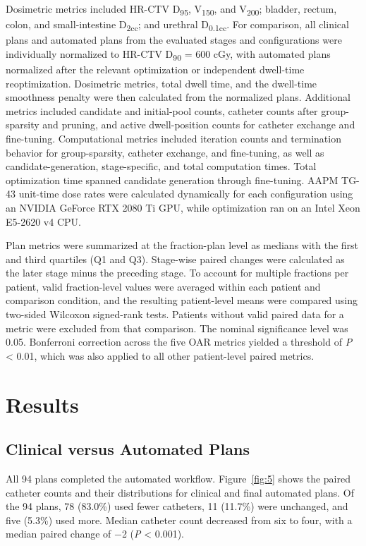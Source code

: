 \documentclass[12pt,twoside,letterpaper]{article}
\begin{document}
Dosimetric metrics included HR-CTV D\textsubscript{95}, V\textsubscript{150}, and V\textsubscript{200}; bladder, rectum, colon, and small-intestine D\textsubscript{2cc}; and urethral D\textsubscript{0.1cc}. For comparison, all clinical plans and automated plans from the evaluated stages and configurations were individually normalized to HR-CTV D\textsubscript{90} = 600 cGy, with automated plans normalized after the relevant optimization or independent dwell-time reoptimization. Dosimetric metrics, total dwell time, and the dwell-time smoothness penalty were then calculated from the normalized plans. Additional metrics included candidate and initial-pool counts, catheter counts after group-sparsity and pruning, and active dwell-position counts for catheter exchange and fine-tuning. Computational metrics included iteration counts and termination behavior for group-sparsity, catheter exchange, and fine-tuning, as well as candidate-generation, stage-specific, and total computation times. Total optimization time spanned candidate generation through fine-tuning. AAPM TG-43 unit-time dose rates\cite{ref79} were calculated dynamically for each configuration using an NVIDIA GeForce RTX 2080 Ti GPU, while optimization ran on an Intel Xeon E5-2620 v4 CPU.

Plan metrics were summarized at the fraction-plan level as medians with the first and third quartiles (Q1 and Q3). Stage-wise paired changes were calculated as the later stage minus the preceding stage. To account for multiple fractions per patient, valid fraction-level values were averaged within each patient and comparison condition, and the resulting patient-level means were compared using two-sided Wilcoxon signed-rank tests. Patients without valid paired data for a metric were excluded from that comparison. The nominal significance level was 0.05. Bonferroni correction across the five OAR metrics yielded a threshold of \emph{P} < 0.01, which was also applied to all other patient-level paired metrics.

\FloatBarrier
\section{Results}\label{sec:3}

\subsection{Clinical versus Automated Plans}\label{sec:3-1}

All 94 plans completed the automated workflow. Figure~\ref{fig:5} shows the paired catheter counts and their distributions for clinical and final automated plans. Of the 94 plans, 78 (83.0\%) used fewer catheters, 11 (11.7\%) were unchanged, and five (5.3\%) used more. Median catheter count decreased from six to four, with a median paired change of \ensuremath{-}2 (\emph{P} < 0.001).
\end{document}
